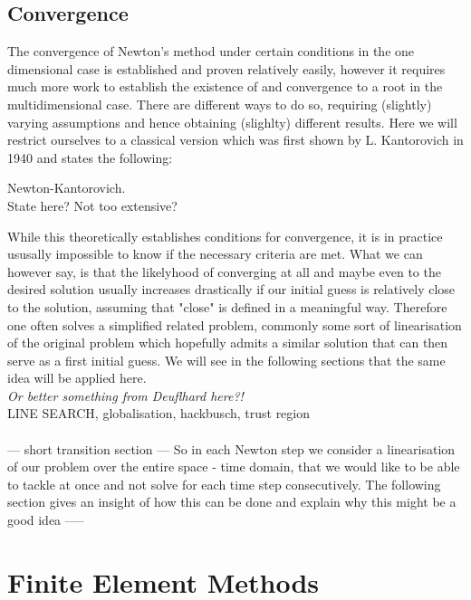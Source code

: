 \documentclass[../draft_1.tex]{subfiles}
\begin{document}
\subsection{Convergence}

The convergence of Newton's method under certain conditions in the one dimensional case is established and proven relatively easily, however it requires much more work to establish the existence of and convergence to a root in the multidimensional case. There are different ways to do so, requiring (slightly) varying assumptions and hence obtaining (slighlty) different results. Here we will restrict ourselves to a classical version which was first shown by L. Kantorovich in 1940 and states the following:

\begin{Theorem}{Newton-Kantorovich.} \\
	State here? Not too extensive? 
\end{Theorem}

While this theoretically establishes conditions for convergence, it is in practice ususally impossible to know if the necessary criteria are met. What we can however say, is that the likelyhood of converging at all and maybe even to the desired solution usually increases drastically if our initial guess is relatively close to the solution, assuming that "close" is defined in a meaningful way. Therefore one often solves a simplified related problem, commonly some sort of linearisation of the original problem which hopefully admits a similar solution that can then serve as a first initial guess. We will see in the following sections that the same idea will be applied here. 
\bigskip
\\
\textit{Or better something from Deuflhard here?!}
\bigskip
\\

LINE SEARCH, globalisation, hackbusch, trust region \\
\\
--- short transition section --- So in each Newton step we consider a linearisation of our problem over the entire space - time domain, that we would like to be able to tackle at once and not solve for each time step consecutively. The following section gives an insight of how this can be done and explain why this might be a good idea -----

\section{Finite Element Methods}
\end{document}
